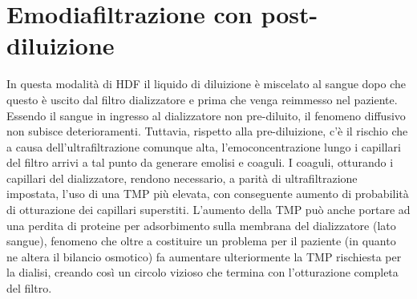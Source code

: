 \section{Emodiafiltrazione con post-diluizione}
In questa modalità di HDF il liquido di diluizione è miscelato al sangue dopo che questo è uscito dal filtro dializzatore e prima che venga reimmesso nel paziente. Essendo il sangue in ingresso al dializzatore non pre-diluito, il fenomeno diffusivo non subisce deterioramenti. Tuttavia, rispetto alla pre-diluizione, c'è il rischio che a causa dell'ultrafiltrazione comunque alta, l'emoconcentrazione lungo i capillari del filtro arrivi a tal punto da generare emolisi e coaguli. I coaguli, otturando i capillari del dializzatore, rendono necessario, a parità di ultrafiltrazione impostata, l'uso di una TMP più elevata, con conseguente aumento di probabilità di otturazione dei capillari superstiti. L'aumento della TMP può anche portare ad una perdita di proteine per adsorbimento sulla membrana del dializzatore (lato sangue), fenomeno che oltre a costituire un problema per il paziente (in quanto ne altera il bilancio osmotico) fa aumentare ulteriormente la TMP rischiesta per la dialisi, creando così un circolo vizioso che termina con l'otturazione completa del filtro.

